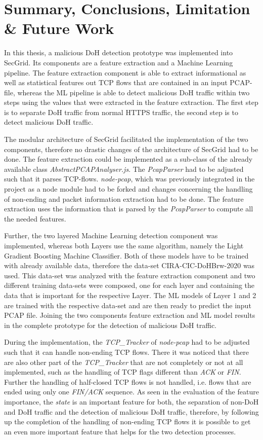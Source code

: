 \chapter{Summary, Conclusions, Limitation \& Future Work} \label{summary}
In this thesis, a malicious DoH detection prototype was implemented into SecGrid. Its components are a feature extraction and a Machine Learning pipeline. The feature extraction component is able to extract informational as well as statistical features out TCP flows that are contained in an input PCAP-file, whereas the ML pipeline is able to detect malicious DoH traffic within two steps using the values that were extracted in the feature extraction. The first step is to separate DoH traffic from normal HTTPS traffic, the second step is to detect malicious DoH traffic.

The modular architecture of SecGrid facilitated the implementation of the two components, therefore no drastic changes of the architecture of SecGrid had to be done. The feature extraction could be implemented as a sub-class of the already available class \textit{AbstractPCAPAnalyser.js}. The \textit{PcapParser} had to be adjusted such that it parses TCP-flows. \textit{node-pcap}, which was previously integrated in the project as a node module had to be forked and changes concerning the handling of non-ending and packet information extraction had to be done. The feature extraction uses the information that is parsed by the \textit{PcapParser} to compute all the needed features.

Further, the two layered Machine Learning detection component was implemented, whereas both Layers use the same algorithm, namely the Light Gradient Boosting Machine Classifier. Both of these models have to be trained with already available data, therefore the data-set CIRA-CIC-DoHBrw-2020 \cite{CIRA-CIC-DoHBrw-2020} was used. This data-set was analyzed with the feature extraction component and two different training data-sets were composed, one for each layer and containing the data that is important for the respective Layer. The ML models of Layer 1 and 2 are trained with the respective data-set and are then ready to predict the input PCAP file. Joining the two components feature extraction and ML model results in the complete prototype for the detection of malicious DoH traffic.

During the implementation, the \textit{TCP\_Tracker} of \textit{node-pcap} had to be adjusted such that it can handle non-ending TCP flows. There it was noticed that there are also other part of the \textit{TCP\_Tracker} that are not completely or not at all implemented, such as the handling of TCP flags different than \textit{ACK} or \textit{FIN}. Further the handling of half-closed TCP flows is not handled, i.e. flows that are ended using only one \textit{FIN/ACK} sequence. As seen in the evaluation of the feature importance, the \textit{state} is an important feature for both, the separation of non-DoH and DoH traffic and the detection of malicious DoH traffic, therefore, by following up the completion of the handling of non-ending TCP flows it is possible to get an even more important feature that helps for the two detection processes.

